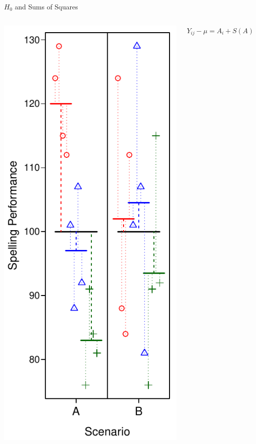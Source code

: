 \documentclass[presentation]{beamer}
\begin{document}
\begin{frame}[label={sec:org78258d4}]{\(H_0\) and Sums of Squares}
\begin{columns}
\begin{column}{.27\columnwidth}
\includegraphics[scale=.5]{08_glm_img/spelling-05.pdf}
\end{column}

\begin{column}{.73\columnwidth}
\(Y_{ij} - \mu = A_i + S(A)_{ij}\)


\end{column}
\end{columns}
\end{frame}
\end{document}

